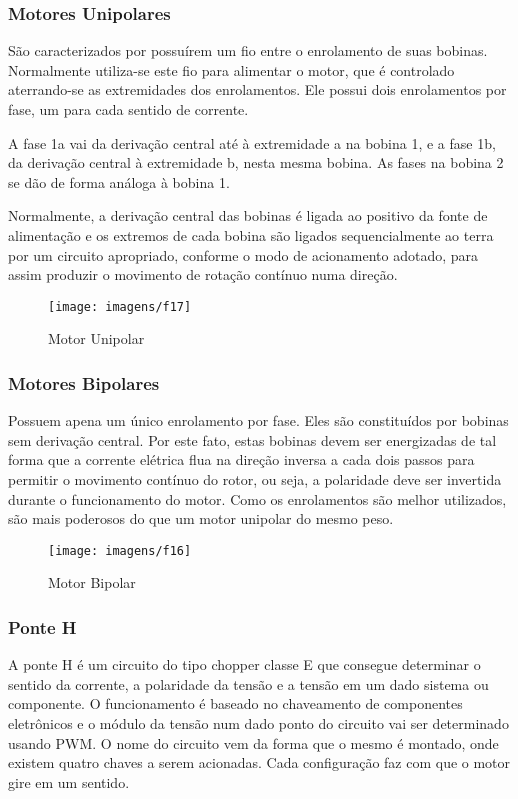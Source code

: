 \subsubsection{Motores Unipolares}

São caracterizados por possuírem um fio entre o enrolamento de suas bobinas. Normalmente utiliza-se este fio para alimentar o motor, que é controlado aterrando-se as extremidades dos enrolamentos. Ele possui dois enrolamentos por fase, um para cada sentido de corrente. 

A fase 1a vai da derivação central até à extremidade a na bobina 1, e a fase 1b, da derivação central à extremidade b, nesta mesma bobina. As fases na bobina 2 se dão de forma análoga à bobina 1.

Normalmente, a derivação central das bobinas é ligada ao positivo da fonte de alimentação e os extremos de cada
bobina são ligados sequencialmente ao terra por um circuito apropriado, conforme o modo de acionamento adotado, para assim produzir o movimento de rotação contínuo numa direção. 

\begin{figure}[ht!]
    \center 
    \texttt{[image: imagens/f17]}
    \caption{Motor Unipolar}
\end{figure}

\subsubsection{Motores Bipolares}

Possuem apena um único enrolamento por fase. Eles são constituídos por bobinas sem derivação central. Por este fato, estas bobinas devem ser energizadas de tal forma que a corrente elétrica flua na direção inversa a cada dois passos para permitir o movimento contínuo do rotor, ou seja, a polaridade deve ser invertida durante o funcionamento do motor. Como os enrolamentos são melhor utilizados, são mais poderosos do que um motor unipolar do mesmo peso.


\begin{figure}[ht!]
    \center 
    \texttt{[image: imagens/f16]}
    \caption{Motor Bipolar}
\end{figure}

\subsubsection{Ponte H}

A ponte H é um circuito do tipo chopper classe E que consegue determinar o sentido da corrente, a polaridade da tensão e a tensão em um dado sistema ou componente. O funcionamento é baseado no chaveamento de componentes eletrônicos e o módulo da tensão num dado ponto do circuito vai ser determinado usando PWM. O nome do circuito vem da forma que o mesmo é montado, onde existem quatro chaves a serem acionadas. Cada configuração faz com que o motor gire em um sentido. 

